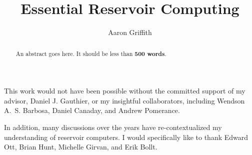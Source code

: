 \documentclass[11pt,draft,phd]{osudiss-2}
\title{Essential Reservoir Computing}
\author{Aaron Griffith}
\begin{document}
\frontmatter

\begin{abstract}
  An abstract goes here. It should be less than \textbf{500 words}.
\end{abstract}

\dedication{For my parents Gregory and Mary Lea, and my brother Nathan.}

\begin{acknowledgments}
  This work would not have been possible without the committed support
  of my advisor, Daniel J. Gauthier, or my insightful collaborators,
  including Wendson A.~S. Barbosa, Daniel Canaday, and Andrew
  Pomerance.

  In addition, many discussions over the years have
  re-contextualized my understanding of reservoir computers. I would
  specifically like to thank Edward Ott, Brian Hunt, Michelle Girvan,
  and Erik Bollt.
\end{acknowledgments}

\begin{vita}

  \begin{publist}
  \end{publist}

  \begin{fieldsstudy}
  \end{fieldsstudy}
\end{vita}

\tableofcontents 

\clearpage
\listoffigures 

\clearpage
\listoftables 


\mainmatter


\backmatter


\appendix
%
%
\end{document}

